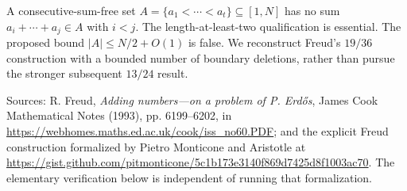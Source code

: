 A consecutive-sum-free set $A=\{a_1<\cdots<a_t\}\subseteq[1,N]$ has no sum $a_i+\cdots+a_j\in A$ with $i<j$. The length-at-least-two qualification is essential. The proposed bound $|A|\le N/2+O(1)$ is false. We reconstruct Freud's $19/36$ construction with a bounded number of boundary deletions, rather than pursue the stronger subsequent $13/24$ result.

Sources: R. Freud, \emph{Adding numbers---on a problem of P. Erd\H{o}s}, James Cook Mathematical Notes (1993), pp. 6199--6202, in \url{https://webhomes.maths.ed.ac.uk/cook/iss_no60.PDF}; and the explicit Freud construction formalized by Pietro Monticone and Aristotle at \url{https://gist.github.com/pitmonticone/5c1b173e3140f869d7425d8f1003ac70}. The elementary verification below is independent of running that formalization.
